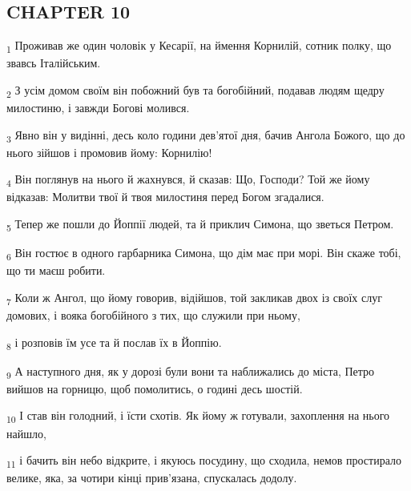 \subsection{CHAPTER 10}
\begin{tcolorbox}
\textsubscript{1} Проживав же один чоловік у Кесарії, на ймення Корнилій, сотник полку, що звавсь Італійським.
\end{tcolorbox}
\begin{tcolorbox}
\textsubscript{2} З усім домом своїм він побожний був та богобійний, подавав людям щедру милостиню, і завжди Богові молився.
\end{tcolorbox}
\begin{tcolorbox}
\textsubscript{3} Явно він у видінні, десь коло години дев'ятої дня, бачив Ангола Божого, що до нього зійшов і промовив йому: Корнилію!
\end{tcolorbox}
\begin{tcolorbox}
\textsubscript{4} Він поглянув на нього й жахнувся, й сказав: Що, Господи? Той же йому відказав: Молитви твої й твоя милостиня перед Богом згадалися.
\end{tcolorbox}
\begin{tcolorbox}
\textsubscript{5} Тепер же пошли до Йоппії людей, та й приклич Симона, що зветься Петром.
\end{tcolorbox}
\begin{tcolorbox}
\textsubscript{6} Він гостює в одного гарбарника Симона, що дім має при морі. Він скаже тобі, що ти маєш робити.
\end{tcolorbox}
\begin{tcolorbox}
\textsubscript{7} Коли ж Ангол, що йому говорив, відійшов, той закликав двох із своїх слуг домових, і вояка богобійного з тих, що служили при ньому,
\end{tcolorbox}
\begin{tcolorbox}
\textsubscript{8} і розповів їм усе та й послав їх в Йоппію.
\end{tcolorbox}
\begin{tcolorbox}
\textsubscript{9} А наступного дня, як у дорозі були вони та наближались до міста, Петро вийшов на горницю, щоб помолитись, о годині десь шостій.
\end{tcolorbox}
\begin{tcolorbox}
\textsubscript{10} І став він голодний, і їсти схотів. Як йому ж готували, захоплення на нього найшло,
\end{tcolorbox}
\begin{tcolorbox}
\textsubscript{11} і бачить він небо відкрите, і якуюсь посудину, що сходила, немов простирало велике, яка, за чотири кінці прив'язана, спускалась додолу.
\end{tcolorbox}
